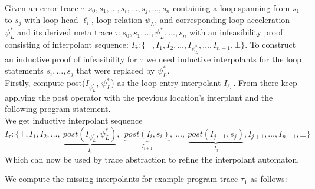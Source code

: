 \documentclass{article}
\begin{document}
	Given an error trace $\tau: s_0, s_1, \ldots , s_i, \ldots , s_j, \ldots , s_n$ containing a loop spanning from $s_1$ to $s_j$ with loop head $\ell_i$, loop relation $\psi_L$, and corresponding loop acceleration $\psi^*_{L}$ and its derived meta trace $\bar{\tau}: s_0, s_1, \ldots, \psi^*_{L}, \ldots , s_n$ with an infeasibility proof consisting of interpolant sequence: $I_{\bar{\tau}}: \{\top, I_1, I_2, \ldots , I_{\psi^*_{L}}, \ldots , I_{n-1}, \bot \}$. 
	To construct an inductive proof of infeasibility for $\tau$ we need inductive interpolants for the loop statements $s_i, \ldots , s_j$ that were replaced by $\psi^*_{L}$. \\
	Firstly, compute post($I_{\psi^*_L}$, $\psi^*_L$) as the loop entry interpolant $I_{\ell_L}$. From there keep applying the post operator with the previous location's interplant and the following program statement. \\
	We get inductive interpolant sequence
	\begin{equation*}
		I_\tau: \{\top,I_1,I_2, \ldots ,\ \underbrace{post(I_{\psi^*_L}, \psi^*_L)}_{I_{i}},\ \ \underbrace{post(I_{i}, s_i)}_{I_{i+1}},\ \ldots ,\ \underbrace{post(I_{j-1}, s_j)}_{I_{j}},I_{j+1}, \ldots ,I_{n-1}, \bot \}
	\end{equation*}
	Which can now be used by trace abstraction to refine the interpolant automaton.

We compute the missing interpolants for example program trace $\tau_1$ as follows:
\end{document}
